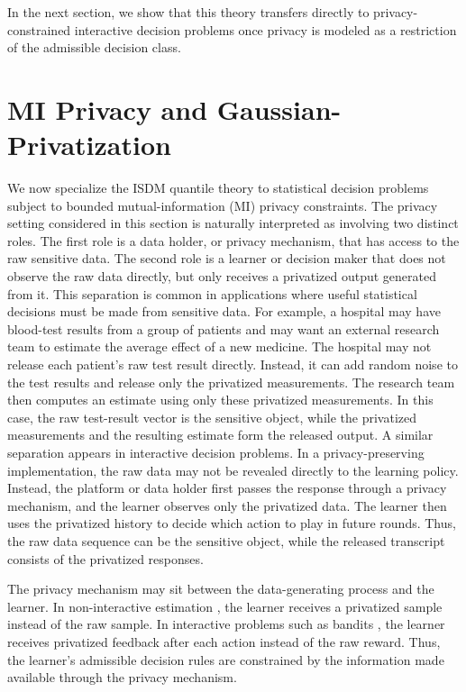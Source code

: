 \documentclass[journal]{IEEEtran}
\begin{document}
In the next section, we show that this theory transfers directly to privacy-constrained interactive decision problems once privacy is modeled as a restriction of the admissible decision class.

\section{MI Privacy and Gaussian-Privatization}
\label{sec:mi-private}

We now specialize the ISDM quantile theory to statistical decision problems
subject to bounded mutual-information (MI) privacy constraints. The privacy
setting considered in this section is naturally interpreted as involving two
distinct roles. The first role is a data holder, or privacy mechanism, that has
access to the raw sensitive data. The second role is a learner or decision
maker that does not observe the raw data directly, but only receives a
privatized output generated from it. This separation is common in applications where useful statistical decisions
must be made from sensitive data. For example, a hospital may have blood-test
results from a group of patients and may want an external research team to
estimate the average effect of a new medicine. The hospital may not release
each patient's raw test result directly. Instead, it can add random noise to the
test results and release only the privatized measurements. The research team
then computes an estimate using only these privatized measurements. In this
case, the raw test-result vector is the sensitive object, while the privatized
measurements and the resulting estimate form the released output. A similar separation appears in interactive decision problems.
In a privacy-preserving implementation, the raw data may not be revealed
directly to the learning policy. Instead, the platform or data holder first
passes the response through a privacy mechanism, and the learner observes only the
privatized data. The learner then uses the privatized history to decide
which action to play in future rounds. Thus, the raw data  sequence can be the sensitive object, while the released transcript consists of the privatized responses.

The privacy mechanism may sit between the data-generating
process and the learner. In non-interactive estimation \cite{ma2024high}, the learner receives a privatized
sample instead of the raw sample. In interactive problems such as bandits \cite{lattimore2020bandit}, the learner receives privatized
feedback after each action instead of the raw reward. Thus, the learner's
admissible decision rules are constrained by the information made available
through the privacy mechanism.
\end{document}
